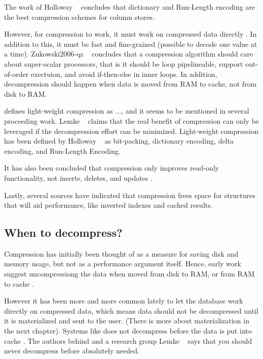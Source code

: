 The work of Holloway \ea~\cite{Holloway2008-rr} concludes that dictionary and Run-Length encoding are the best compression schemes for column stores.

However, for compression to work, it must work on compressed data directly \cite{Lemke2010-is}. In addition to this, it must be fast and fine-grained (possible to decode one value at a time). Zukowski2006-qz \ea~\cite{Zukowski2006-oz} concludes that a compression algorithm should care about super-scalar processors, that is it should be loop pipelineable, support out-of-order exectuion, and avoid if-then-else in inner loops. In addition, decompression should happen when data is moved from RAM to cache, not from disk to RAM. 

\cite{Westmann2000-mz} defines light-weight compression as ..., and it seems to be mentioned in several proceeding work. Lemke \ea~\cite{Lemke2010-is} claims that the real benefit of compression can only be leveraged if the decompression effort can be minimized. Light-weight compression has been defined by Holloway \ea~\cite{Holloway2008} as bit-packing, dictionary encoding, delta encoding, and Run-Length Encoding.

It has also been concluded that compression only improves read-only functionality, not inserts, deletes, and updates \cite{Westmann200-mz}.

Lastly, several sources \cite{Lamb2012-kg, Lahiri2015-mz} have indicated that compression frees space for structures that will aid performance, like inverted indexes and cached results.

\subsection{When to decompress?}
\label{sub:When to decompress?}
Compression has initially been thought of as a measure for saving disk and memory usage, but not as a performance argument itself. Hence, early work suggest uncompressiong the data when moved from disk to RAM, or from RAM to cache \cite{Zukowski2006-oz}. 

However it has been more and more common lately to let the database work directly on compressed data, which means data should not be decompressed until it is materialized and sent to the user. (There is more about materialization in the next chapter). Systems like \monetx does not decompress before the data is put into cache \cite{Johnson2008-cp}. The authors behind \blink \cite{Barber2012-xt} and a research group Lemke \ea~\cite{Lemke2010-is} says that you should never decompress before absolutely needed. 


